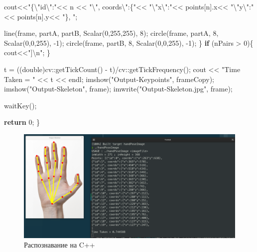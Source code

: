 \documentclass[
  12pt,
  a4paper,
]{article}
\newenvironment{Shaded}{}{}
\newcommand{\ControlFlowTok}[1]{\textcolor[rgb]{0.00,0.44,0.13}{\textbf{#1}}}
\newcommand{\DataTypeTok}[1]{\textcolor[rgb]{0.56,0.13,0.00}{#1}}
\newcommand{\DecValTok}[1]{\textcolor[rgb]{0.25,0.63,0.44}{#1}}
\newcommand{\NormalTok}[1]{#1}
\newcommand{\SpecialCharTok}[1]{\textcolor[rgb]{0.25,0.44,0.63}{#1}}
\newcommand{\StringTok}[1]{\textcolor[rgb]{0.25,0.44,0.63}{#1}}
\begin{document}
\begin{Shaded}
\begin{Highlighting}[numbers=left,,]
\NormalTok{        cout\textless{}\textless{}}\StringTok{"\{}\SpecialCharTok{\textbackslash{}"}\StringTok{id}\SpecialCharTok{\textbackslash{}"}\StringTok{:"}\NormalTok{\textless{}\textless{} n \textless{}\textless{} }\StringTok{"}\SpecialCharTok{\textbackslash{}"}\StringTok{, coords}\SpecialCharTok{\textbackslash{}"}\StringTok{:\{"}\NormalTok{\textless{}\textless{} }\StringTok{"}\SpecialCharTok{\textbackslash{}"}\StringTok{x}\SpecialCharTok{\textbackslash{}"}\StringTok{:"}\NormalTok{\textless{}\textless{} points[n].x\textless{}\textless{} }\StringTok{"}\SpecialCharTok{\textbackslash{}"}\StringTok{y}\SpecialCharTok{\textbackslash{}"}\StringTok{:"}\NormalTok{\textless{}\textless{} points[n].y\textless{}\textless{} }\StringTok{"\}, "}\NormalTok{;}

\NormalTok{        line(frame, partA, partB, Scalar(}\DecValTok{0}\NormalTok{,}\DecValTok{255}\NormalTok{,}\DecValTok{255}\NormalTok{), }\DecValTok{8}\NormalTok{);}
\NormalTok{        circle(frame, partA, }\DecValTok{8}\NormalTok{, Scalar(}\DecValTok{0}\NormalTok{,}\DecValTok{0}\NormalTok{,}\DecValTok{255}\NormalTok{), {-}}\DecValTok{1}\NormalTok{);}
\NormalTok{        circle(frame, partB, }\DecValTok{8}\NormalTok{, Scalar(}\DecValTok{0}\NormalTok{,}\DecValTok{0}\NormalTok{,}\DecValTok{255}\NormalTok{), {-}}\DecValTok{1}\NormalTok{);}
\NormalTok{    \}}
    \ControlFlowTok{if}\NormalTok{ (nPairs \textgreater{} }\DecValTok{0}\NormalTok{)\{}
\NormalTok{        cout\textless{}\textless{}}\StringTok{"]}\SpecialCharTok{\textbackslash{}n}\StringTok{"}\NormalTok{;}
\NormalTok{    \}}

\NormalTok{    t = ((}\DataTypeTok{double}\NormalTok{)cv::getTickCount() {-} t)/cv::getTickFrequency();}
\NormalTok{    cout \textless{}\textless{} }\StringTok{"Time Taken = "}\NormalTok{ \textless{}\textless{} t \textless{}\textless{} endl;}
\NormalTok{    imshow(}\StringTok{"Output{-}Keypoints"}\NormalTok{, frameCopy);}
\NormalTok{    imshow(}\StringTok{"Output{-}Skeleton"}\NormalTok{, frame);}
\NormalTok{    imwrite(}\StringTok{"Output{-}Skeleton.jpg"}\NormalTok{, frame);}

\NormalTok{    waitKey();}

    \ControlFlowTok{return} \DecValTok{0}\NormalTok{;}
\NormalTok{\}}
\end{Highlighting}
\end{Shaded}

\begin{figure}
\centering
\includegraphics{pics/hw2_cppHand_out.png}
\caption{Распознавание на C++}
\end{figure}
\end{document}
